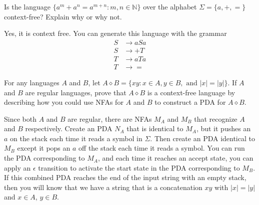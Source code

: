 \documentclass[12pt]{exam}
\newcommand{\on}{\operatorname}
\newcommand{\N}{\mathbb{N}}
\begin{document}
\begin{questions}
\question Is the language $\{a^m + a^n = a^{m+n} : m, n \in \N \}$ over the alphabet $\Sigma = \{a, +, = \}$ context-free?  Explain why or why not.
\begin{solution}
Yes, it is context free.  You can generate this language with the grammar 
\begin{align*}
S &\rightarrow aSa \\
S &\rightarrow +T \\
T &\rightarrow aTa \\
T &\rightarrow =
\end{align*}
\end{solution}
\vfill


\question For any languages $A$ and $B$, let $A \diamond B = \{ xy : x \in A, y\in B, \text{ and } |x| = |y| \}$. If $A$ and $B$ are regular languages, prove that $A \diamond B$ is a context-free language by describing how you could use NFAs for $A$ and $B$ to construct a PDA for $A \diamond B$.   
\begin{solution}
Since both $A$ and $B$ are regular, there are NFAs $M_A$ and $M_B$ that recognize $A$ and $B$ respectively. Create an PDA $N_A$ that is identical to $M_A$, but it pushes an $a$ on the stack each time it reads a symbol in $\Sigma$. Then create an PDA identical to $M_B$ except it pops an $a$ off the stack each time it reads a symbol.  You can run the PDA corresponding to $M_A$, and each time it reaches an accept state, you can apply an $\epsilon$ transition to activate the start state in the PDA corresponding to $M_B$.  If this combined PDA reaches the end of the input string with an empty stack, then you will know that we have a string that is a concatenation $xy$ with $|x| = |y|$ and $x \in A$, $y \in B$. 
\end{solution}
\vfill

%

\end{questions}
\end{document}
